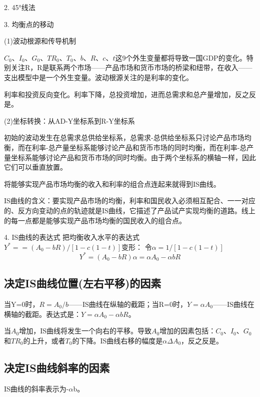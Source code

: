 \documentclass{article}
\begin{document}
\hspace*{\fill}

2. 45°线法

\hspace*{\fill}

3. 均衡点的移动

(1)波动根源和传导机制

$ C_0 $、$ I_0 $、$ G_0 $、$ TR_0 $、$ T_0 $、$ b $、$ R $、$ c $、$ t $这9个外生变量都将导致一国GDP的变化。特别关注R，R是联系两个市场——产品市场和货币市场的桥梁和纽带，在收入——支出模型中是一个外生变量。波动根源关注的是利率的变化。

利率和投资反向变化。利率下降，总投资增加，进而总需求和总产量增加，反之反是。

(2)坐标转换：从AD-Y坐标系到R-Y坐标系

初始的波动发生在总需求总供给坐标系，总需求-总供给坐标系只讨论产品市场均衡，而在利率-总产量坐标系能够讨论产品和货币市场的同时均衡，而在利率-总产量坐标系能够讨论产品和货币市场的同时均衡。由于两个坐标系的横轴一样，因此它们可以垂直放置。

将能够实现产品市场均衡的收入和利率的组合点连起来就得到IS曲线。

IS曲线的含义：要实现产品市场的均衡，利率和国民收入必须相互配合、一一对应的、反方向变动的点的轨迹就是IS曲线，它描述了产品试产实现均衡的道路。线上的每一点都是能够实现产品市场均衡的国民收入的组合点。

\hspace*{\fill}

4. IS曲线的表达式
把均衡收入水平的表达式$ Y^*==(A_0-bR)/[1-c(1-t)] $变形：
令$ \alpha=1/[1-c(1-t)] $
\[
Y^*=(A_0-bR)\alpha=\alpha A_0-\alpha bR
\]

\subsection{决定IS曲线位置(左右平移)的因素}
当Y=0时，$ R=A_0/b $——IS曲线在纵轴的截距；当R=0时，$ Y=\alpha A_0 $——IS曲线在横轴的截距。表达式是：$ Y=\alpha A_0-\alpha bR $。

当$ A_0 $增加，IS曲线将发生一个向右的平移。导致$ A_0 $增加的因素包括：$ C_0 $、$ I_0 $、$ G_0 $和$ TR_0 $的上升，或者$ T_0 $的下降。IS曲线右移的幅度是$ \alpha\Delta A_0 $，反之反是。

\subsection{决定IS曲线斜率的因素}
IS曲线的斜率表示为-$ \alpha $b。
\end{document}
